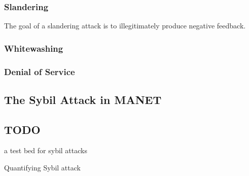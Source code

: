 \subsubsection{Slandering}
The goal of a slandering attack is to illegitimately produce negative feedback. 

\subsubsection{Whitewashing}


\subsubsection{Denial of Service}


\subsection{The Sybil Attack in MANET}

\subsection{TODO}
a test bed for sybil attacks\cite{irissappane2012towards}

Quantifying Sybil attack\cite{margolin2008quantifying}

